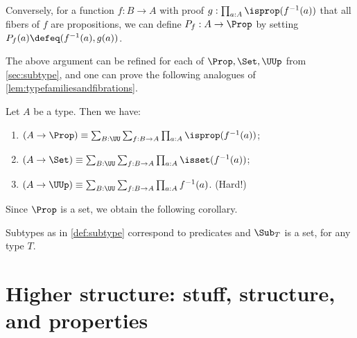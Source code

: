 Conversely,
for a function $f: B\to A$ with proof
$g:\prod_{a:A} \isprop(f^{-1}(a))$ that all fibers of $f$
are propositions,
we can define $P_f : A\to\Prop$ by setting $P_f(a)\defeq (f^{-1}(a),g(a))$.

The above argument can be refined for each of $\Prop,\Set,\UUp$
from \cref{sec:subtype}, and one can prove the following
analogues of \cref{lem:typefamiliesandfibrations}.

\begin{lemma}\label{lem:Prop-Set-pointed-families}
Let $A$ be a type. Then we have:
\begin{enumerate}
\item $(A\to\Prop) \equiv \sum_{B:\UU}\sum_{f:B\to A}
\prod_{a:A}\isprop({f^{-1}(a)})$;
\item \label{lem:Set-families}
$(A\to\Set) \equiv \sum_{B:\UU}\sum_{f:B\to A}
\prod_{a:A}\isset({f^{-1}(a)})$;
\item $(A\to\UUp) \equiv \sum_{B:\UU}\sum_{f:B\to A}
\prod_{a:A}f^{-1}(a)$. (Hard!)
\end{enumerate}
\end{lemma}

Since $\Prop$ is a set, we obtain the following corollary.
\begin{corollary}\label{cor:Sub_T-is-set}
Subtypes as in \cref{def:subtype} correspond to predicates
and $\Sub_T$ is a set, for any type $T$.
\end{corollary}

\section{Higher structure: stuff, structure, and properties}
\label{sec:stuff-struct-prop}

